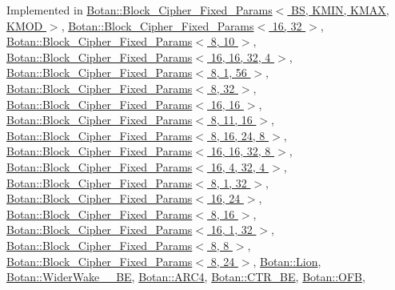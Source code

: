 Implemented in \hyperlink{classBotan_1_1Block__Cipher__Fixed__Params_a585d9f6c14f0f09c93636c1f97197a94}{Botan\-::\-Block\-\_\-\-Cipher\-\_\-\-Fixed\-\_\-\-Params$<$ B\-S, K\-M\-I\-N, K\-M\-A\-X, K\-M\-O\-D $>$}, \hyperlink{classBotan_1_1Block__Cipher__Fixed__Params_a585d9f6c14f0f09c93636c1f97197a94}{Botan\-::\-Block\-\_\-\-Cipher\-\_\-\-Fixed\-\_\-\-Params$<$ 16, 32 $>$}, \hyperlink{classBotan_1_1Block__Cipher__Fixed__Params_a585d9f6c14f0f09c93636c1f97197a94}{Botan\-::\-Block\-\_\-\-Cipher\-\_\-\-Fixed\-\_\-\-Params$<$ 8, 10 $>$}, \hyperlink{classBotan_1_1Block__Cipher__Fixed__Params_a585d9f6c14f0f09c93636c1f97197a94}{Botan\-::\-Block\-\_\-\-Cipher\-\_\-\-Fixed\-\_\-\-Params$<$ 16, 16, 32, 4 $>$}, \hyperlink{classBotan_1_1Block__Cipher__Fixed__Params_a585d9f6c14f0f09c93636c1f97197a94}{Botan\-::\-Block\-\_\-\-Cipher\-\_\-\-Fixed\-\_\-\-Params$<$ 8, 1, 56 $>$}, \hyperlink{classBotan_1_1Block__Cipher__Fixed__Params_a585d9f6c14f0f09c93636c1f97197a94}{Botan\-::\-Block\-\_\-\-Cipher\-\_\-\-Fixed\-\_\-\-Params$<$ 8, 32 $>$}, \hyperlink{classBotan_1_1Block__Cipher__Fixed__Params_a585d9f6c14f0f09c93636c1f97197a94}{Botan\-::\-Block\-\_\-\-Cipher\-\_\-\-Fixed\-\_\-\-Params$<$ 16, 16 $>$}, \hyperlink{classBotan_1_1Block__Cipher__Fixed__Params_a585d9f6c14f0f09c93636c1f97197a94}{Botan\-::\-Block\-\_\-\-Cipher\-\_\-\-Fixed\-\_\-\-Params$<$ 8, 11, 16 $>$}, \hyperlink{classBotan_1_1Block__Cipher__Fixed__Params_a585d9f6c14f0f09c93636c1f97197a94}{Botan\-::\-Block\-\_\-\-Cipher\-\_\-\-Fixed\-\_\-\-Params$<$ 8, 16, 24, 8 $>$}, \hyperlink{classBotan_1_1Block__Cipher__Fixed__Params_a585d9f6c14f0f09c93636c1f97197a94}{Botan\-::\-Block\-\_\-\-Cipher\-\_\-\-Fixed\-\_\-\-Params$<$ 16, 16, 32, 8 $>$}, \hyperlink{classBotan_1_1Block__Cipher__Fixed__Params_a585d9f6c14f0f09c93636c1f97197a94}{Botan\-::\-Block\-\_\-\-Cipher\-\_\-\-Fixed\-\_\-\-Params$<$ 16, 4, 32, 4 $>$}, \hyperlink{classBotan_1_1Block__Cipher__Fixed__Params_a585d9f6c14f0f09c93636c1f97197a94}{Botan\-::\-Block\-\_\-\-Cipher\-\_\-\-Fixed\-\_\-\-Params$<$ 8, 1, 32 $>$}, \hyperlink{classBotan_1_1Block__Cipher__Fixed__Params_a585d9f6c14f0f09c93636c1f97197a94}{Botan\-::\-Block\-\_\-\-Cipher\-\_\-\-Fixed\-\_\-\-Params$<$ 16, 24 $>$}, \hyperlink{classBotan_1_1Block__Cipher__Fixed__Params_a585d9f6c14f0f09c93636c1f97197a94}{Botan\-::\-Block\-\_\-\-Cipher\-\_\-\-Fixed\-\_\-\-Params$<$ 8, 16 $>$}, \hyperlink{classBotan_1_1Block__Cipher__Fixed__Params_a585d9f6c14f0f09c93636c1f97197a94}{Botan\-::\-Block\-\_\-\-Cipher\-\_\-\-Fixed\-\_\-\-Params$<$ 16, 1, 32 $>$}, \hyperlink{classBotan_1_1Block__Cipher__Fixed__Params_a585d9f6c14f0f09c93636c1f97197a94}{Botan\-::\-Block\-\_\-\-Cipher\-\_\-\-Fixed\-\_\-\-Params$<$ 8, 8 $>$}, \hyperlink{classBotan_1_1Block__Cipher__Fixed__Params_a585d9f6c14f0f09c93636c1f97197a94}{Botan\-::\-Block\-\_\-\-Cipher\-\_\-\-Fixed\-\_\-\-Params$<$ 8, 24 $>$}, \hyperlink{classBotan_1_1Lion_a9a1a3d0bb3b19990d92c5a88af9fde4e}{Botan\-::\-Lion}, \hyperlink{classBotan_1_1WiderWake__41__BE_a9b788edd7d5d677873cc28c7bb85622a}{Botan\-::\-Wider\-Wake\-\_\-\_\-\-B\-E}, \hyperlink{classBotan_1_1ARC4_a9139296ae024202c842c78c0a2ff27e6}{Botan\-::\-A\-R\-C4}, \hyperlink{classBotan_1_1CTR__BE_a5e69e58fdb80273a3e16fa1427a3057e}{Botan\-::\-C\-T\-R\-\_\-\-B\-E}, \hyperlink{classBotan_1_1OFB_ac65a30e170e337a504ea6ad376346459}{Botan\-::\-O\-F\-B}, 